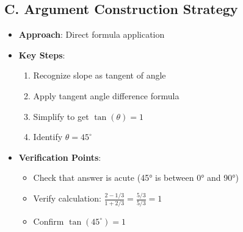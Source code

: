 \documentclass[12pt]{article}
\begin{document}
\begin{strategicbox}
\subsection*{C. Argument Construction Strategy}
\begin{itemize}[leftmargin=*]
    \item \textbf{Approach}: Direct formula application
    \item \textbf{Key Steps}:
    \begin{enumerate}
        \item Recognize slope as tangent of angle
        \item Apply tangent angle difference formula
        \item Simplify to get $\tan(\theta) = 1$
        \item Identify $\theta = 45^\circ$
    \end{enumerate}
    \item \textbf{Verification Points}: 
    \begin{itemize}
        \item Check that answer is acute (45° is between 0° and 90°)
        \item Verify calculation: $\frac{2 - 1/3}{1 + 2/3} = \frac{5/3}{5/3} = 1$
        \item Confirm $\tan(45^\circ) = 1$
    \end{itemize}
\end{itemize}
\end{strategicbox}
\end{document}
